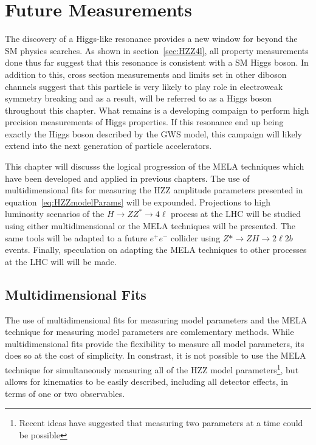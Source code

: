 

\chapter{Future Measurements}
\label{sec:FutureMeasurements}

The discovery of a Higgs-like resonance provides a new window
for beyond the SM physics searches.  As shown in
section~\ref{sec:HZZ4l}, all property measurements done thus
far suggest that this resonance is consistent with a SM Higgs
boson.   In addition to this, cross section measurements and 
limits set in other diboson channels suggest that this particle
is very likely to play role in electroweak symmetry breaking and 
as a result, will be referred to as a Higgs boson throughout this
chapter. 
What remains is a developing compaign to perform high precision
measurements of Higgs properties.  If this resonance end up 
being exactly the Higgs boson described by the GWS model, 
this campaign will likely extend into the next generation of 
particle accelerators.  

This chapter will discusss the logical progression of the MELA
techniques which have been developed and applied in previous 
chapters.  The use of multidimensional fits for measuring the 
HZZ amplitude parameters presented in 
equation~\ref{eq:HZZmodelParams} will be expounded.  
Projections to high luminosity scenarios of the $H\to ZZ^*\to4\ell$
process at the LHC will be studied using either multidimensional
or the MELA techniques will be presented.  The same tools will
be adapted to a future $e^+e^-$ collider using $Z*\to ZH\to 2\ell2b$
events.   Finally, speculation on adapting the MELA techniques to 
other processes at the LHC will will be made. 

\section{Multidimensional Fits}

The use of multidimensional fits for measuring model parameters
and the MELA technique for measuring model parameters are 
comlementary methods.  While multidimensional fits provide 
the flexibility to measure all model parameters, its does so at
the cost of simplicity. In constrast, it is not possible to use
the MELA 
technique for simultaneously measuring all of the HZZ model 
parameters\footnote{Recent ideas have suggested that measuring
two parameters at a time could be possible}, but allows for 
kinematics to be easily described, including all detector effects,
in terms of one or two observables. 

